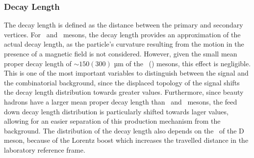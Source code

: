 \subsubsection{Decay Length}
The decay length is defined as the distance between the primary and secondary vertices. For \ds\ and \dpl\ mesons, the decay length provides an approximation of the actual decay length, as the particle's curvature resulting from the motion in the presence of a magnetic field is not considered. However, given the small mean proper decay length of $\sim 150 (300)$ µm of the \ds\ (\dpl) mesons, this effect is negligible. This is one of the most important variables to distinguish between the signal and the combinatorial background, since the displaced topology of the signal shifts the decay length distribution towards greater values. Furthermore, since beauty hadrons have a larger mean proper decay length than \ds\ and \dpl\ mesons, the feed down decay length distribution is particularly shifted towards lager values, allowing for an easier separation of this production mechanism from the background.  The distribution of the decay length also depends on the \pt\ of the D meson, because of the Lorentz boost which increases the travelled distance in the laboratory reference frame. 
